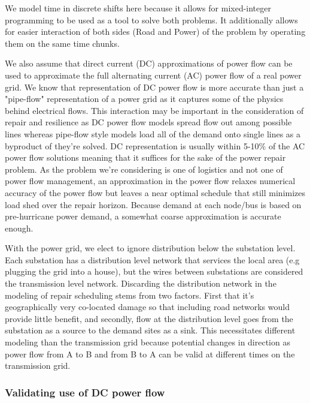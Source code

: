 \documentclass{article}
\begin{document}
	We model time in discrete shifts here because it allows for mixed-integer programming to be used as a tool to solve both problems. It additionally allows for easier interaction of both sides (Road and Power) of the problem by operating them on the same time chunks. 
	
	We also assume that direct current (DC) approximations of power flow can be used to approximate the full alternating current (AC) power flow of a real power grid. We know that representation of DC power flow is more accurate than just a "pipe-flow" representation of a power grid as it captures some of the physics behind electrical flows. This interaction may be important in the consideration of repair and resilience as DC power flow models spread flow out among possible lines whereas pipe-flow style models load all of the demand onto single lines as a byproduct of they're solved. DC representation is usually within 5-10\% of the AC power flow solutions \cite{Frank2016} \cite{StottEA2009} meaning that it suffices for the sake of the power repair problem. As the problem we're considering is one of logistics and not one of power flow management, an approximation in the power flow relaxes numerical accuracy of the power flow but leaves a near optimal schedule that still minimizes load shed over the repair horizon. Because demand at each node/bus is based on pre-hurricane power demand, a somewhat coarse approximation is accurate enough.  
	
	With the power grid, we elect to ignore distribution below the substation level. Each substation has a distribution level network that services the local area (e.g plugging the grid into a house), but the wires between substations are considered the transmission level network. Discarding the distribution network in the modeling of repair scheduling stems from two factors. First that it's geographically very co-located damage so that including road networks would provide little benefit, and secondly, flow at the distribution level goes from the substation as a source to the demand sites as a sink. This necessitates different modeling than the transmission grid because potential changes in direction as power flow from A to B and from B to A can be valid at different times on the transmission grid.
	\subsubsection{Validating use of DC power flow}
	
\end{document}
